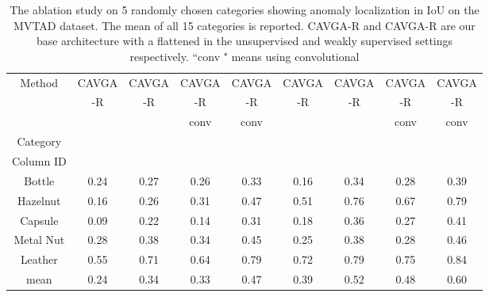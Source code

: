\documentclass[runningheads]{llncs}
\begin{document}
\begin{table}[h!]
\begin{center}
\renewcommand{\arraystretch}{.8}
\setlength{\tabcolsep}{2.0pt}
\caption{
The ablation study on 5 randomly chosen categories showing anomaly localization in IoU on the MVTAD dataset. The mean of all 15 categories is reported. CAVGA-R and CAVGA-R are our base architecture with a flattened  in the unsupervised and weakly supervised settings respectively. ``conv " means using convolutional 
}
\label{ablation_table}
\scriptsize
\begin{tabular}{@{}ccccc@{}cccc@{}}
\toprule
		  Method &CAVGA &CAVGA &CAVGA &CAVGA &CAVGA &CAVGA &CAVGA &CAVGA\\
		              &-R  &-R &-R  &-R  &-R &-R &-R    &-R\\
		  &                &        &  conv  &  conv   &               &          &  conv      &  conv \\
		  Category &                &      &  &    &               &         &   &  \\
\midrule
		Column ID & & & & & & & &\\
\midrule
    	Bottle    &\cellcolor{blue!10}0.24 &\cellcolor{blue!50}0.27 &\cellcolor{blue!30}0.26  &\cellcolor{blue!80}\color{white}0.33 &\cellcolor{blue!10}0.16  &\cellcolor{blue!50}0.34 &\cellcolor{blue!30}0.28   &\cellcolor{blue!80}\color{white}0.39   \\
    	Hazelnut  &\cellcolor{blue!10}0.16 &\cellcolor{blue!30}0.26 &\cellcolor{blue!50}0.31  &\cellcolor{blue!80}\color{white}0.47 &  \cellcolor{blue!10}0.51   &\cellcolor{blue!50}0.76 &\cellcolor{blue!30}0.67   &\cellcolor{blue!80}\color{white}0.79   \\
    	Capsule   &\cellcolor{blue!10}0.09  &\cellcolor{blue!50}0.22   &\cellcolor{blue!30}0.14  &\cellcolor{blue!80}\color{white}0.31  &\cellcolor{blue!10}0.18  &\cellcolor{blue!50}0.36   &\cellcolor{blue!30}0.27 &\cellcolor{blue!80}\color{white}0.41\\
		
		Metal Nut &\cellcolor{blue!10}0.28 &\cellcolor{blue!50}0.38 &\cellcolor{blue!30}0.34  &\cellcolor{blue!80}\color{white}0.45 &  \cellcolor{blue!10}0.25   &\cellcolor{blue!50}0.38 &\cellcolor{blue!30}0.28   &\cellcolor{blue!80}\color{white}0.46   \\
		Leather   &\cellcolor{blue!10}0.55  &\cellcolor{blue!50}0.71   &\cellcolor{blue!30}0.64  &\cellcolor{blue!80}\color{white}0.79  &\cellcolor{blue!10}0.72  &\cellcolor{blue!50}0.79   &\cellcolor{blue!30}0.75 &\cellcolor{blue!80}\color{white}0.84\\
\midrule
mean &\cellcolor{blue!10}0.24 &\cellcolor{blue!50}0.34 &\cellcolor{blue!30}0.33 &\cellcolor{blue!80}\color{white}0.47 &\cellcolor{blue!10}0.39 &\cellcolor{blue!50}0.52 &\cellcolor{blue!30}0.48  &\cellcolor{blue!80}\color{white}0.60\\
\bottomrule 
\end{tabular}
\end{center}
\end{table}
\end{document}
